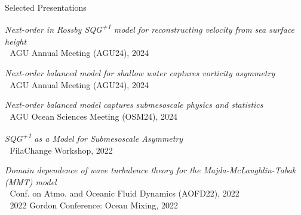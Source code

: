 \documentclass{resume} %
\begin{document}
\begin{rSection}{Selected Presentations}
\renewcommand{\theenumi}{P.\arabic{enumi}}
\begin{etaremune}
    \item \textit{Next-order in Rossby SQG\textsuperscript{+1} model for reconstructing velocity from sea surface height}\\
        $\left.\;\right.$ AGU Annual Meeting (AGU24), \hfill 2024
    \item \textit{Next-order balanced model for shallow water captures vorticity asymmetry}\\
        $\left.\;\right.$ AGU Annual Meeting (AGU24), \hfill 2024
    \item \textit{Next-order balanced model captures submesoscale physics and statistics}\\
        $\left.\;\right.$ AGU Ocean Sciences Meeting (OSM24), \hfill 2024
    \item \textit{SQG\textsuperscript{+1} as a Model for Submesoscale Asymmetry}\\
        $\left.\;\right.$ FilaChange Workshop, \hfill 2022
    \item \textit{Domain dependence of wave turbulence theory for the Majda-McLaughlin-Tabak (MMT) model}\\
        $\left.\;\right.$ Conf. on Atmo. and Oceanic Fluid Dynamics (AOFD22), \hfill 2022\\
        $\left.\;\right.$ 2022 Gordon Conference: Ocean Mixing, \hfill 2022
\end{etaremune}
\end{rSection}


\end{document}
